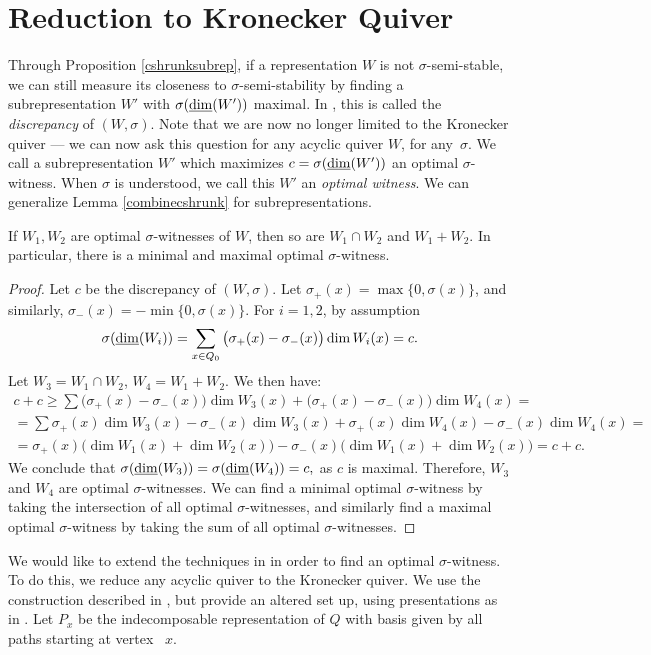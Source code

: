 \section{Reduction to Kronecker Quiver}\label{reduction}

Through Proposition \ref{cshrunksubrep}, if a representation $W$ is not $\sigma$-semi-stable, we can still measure its closeness to $\sigma$-semi-stability by finding a subrepresentation $W'$ with $\sigma(\underline{\rm dim}(W'))$ maximal. In \cite{CK21B}, this is called the \emph{discrepancy} of $(W,\sigma)$. Note that we are now no longer limited to the Kronecker quiver --- we can now ask this question for any acyclic quiver $W$, for any~$\sigma$. We call a subrepresentation $W'$ which maximizes $c=\sigma(\underline{\rm dim}(W'))$ an optimal $\sigma$-witness. When $\sigma$ is understood, we call this $W'$ an \emph{optimal witness}. We can generalize Lemma \ref{combinecshrunk} for subrepresentations.

\begin{proposition}
If $W_1,W_2$ are optimal $\sigma$-witnesses of $W$, then so are $W_1\cap W_2$ and $W_1+W_2$. In particular, there is a minimal and maximal optimal $\sigma$-witness.
\end{proposition}
\begin{proof}
Let $c$ be the discrepancy of $(W,\sigma)$. Let $\sigma_+(x)=\max\{0,\sigma(x)\}$, and similarly, $\sigma_-(x)=-\min\{0,\sigma(x)\}$. For $i=1,2$, by assumption $$\sigma(\underline{\rm dim}(W_i))=\sum_{x\in Q_0} \big(\sigma_+(x)-\sigma_-(x)\big)\dim W_i(x)=c.$$ Let $W_3=W_1\cap W_2$, $W_4=W_1 + W_2$. We then have:
\begin{multline*}
c+c\geq \sum \big(\sigma_+(x)-\sigma_-(x)\big)\dim W_3(x)+\big(\sigma_+(x)-\sigma_-(x)\big)\dim W_4(x)=\\=
\sum \sigma_+(x)\dim W_3(x)-\sigma_-(x)\dim W_3(x)+\sigma_+(x)\dim W_4(x)-\sigma_-(x)\dim W_4(x)=\\=
\sigma_+(x)\big(\dim W_1(x)+\dim W_2(x)\big)-\sigma_-(x)\big(\dim W_1(x)+\dim W_2(x)\big)=c+c.
\end{multline*}
We conclude that  $\sigma(\underline{\rm dim}(W_3))=\sigma(\underline{\rm dim}(W_4))=c,$ as $c$ is maximal.
Therefore, $W_3$ and $W_4$ are optimal $\sigma$-witnesses. We can find a minimal optimal $\sigma$-witness by taking the intersection of all optimal $\sigma$-witnesses, and similarly find a maximal optimal $\sigma$-witness by taking the sum of all optimal $\sigma$-witnesses.
\end{proof}

We would like to extend the techniques in \cite{IQS17} in order to find an optimal $\sigma$-witness. To do this, we reduce any acyclic quiver to the Kronecker quiver. We use the construction described in \cite{DM18}, but provide an altered set up, using presentations as in \cite{DF15}. Let $P_x$ be the indecomposable representation of $Q$ with basis given by all paths starting at vertex ~$x$. 


